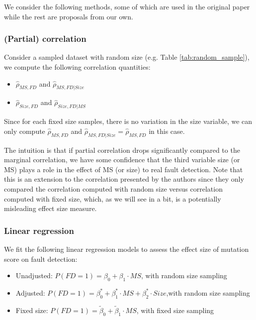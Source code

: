 \documentclass[10pt,letterpaper]{article}
\begin{document}
We consider the following methods, some of which are used in the original paper while the rest are proposals from our own. 


\subsubsection{(Partial) correlation}


Consider a sampled dataset with random size (e.g. Table \ref{tab:random_sample}), we compute the following correlation quantities:

\begin{itemize}
    \item 
    $\hat{\rho}_{MS,FD} $  and  $\hat{\rho}_{MS,FD|Size} $
    \item
     $\hat{\rho}_{Size,FD} $ and $\hat{\rho}_{Size,FD|MS} $
\end{itemize}

Since for each fixed size samples, there is no variation in the size variable, we can only compute $\hat{\rho}_{MS,FD}$ and $\hat{\rho}_{MS,FD|Size}=\hat{\rho}_{MS,FD} $ in this case.

The intuition is that if partial correlation drops significantly compared to the marginal correlation, we have some confidence that the third variable size (or MS) plays a role in the effect of MS (or size) to real fault detection. Note that this is an extension to the correlation presented by the authors since they only compared the correlation computed with random size versus correlation computed with fixed size, which, as we will see in a bit, is a potentially misleading effect size measure.

\subsubsection{Linear regression}

We fit the following linear regression models to assess the effect size of mutation score on fault detection:

\begin{itemize}
    \item 
    Unadjusted:  $P(FD=1) = \beta_0 + \beta_1 \cdot MS$, with random size sampling
    \item
     Adjusted:   $P(FD=1) = \beta^*_0 + \beta^*_1 \cdot MS + \beta^*_2 \cdot Size$,with random size sampling
     \item
     Fixed size: $P(FD=1) = \tilde{\beta}_0 + \tilde{\beta}_1 \cdot MS$, with fixed size sampling
\end{itemize}
\end{document}
